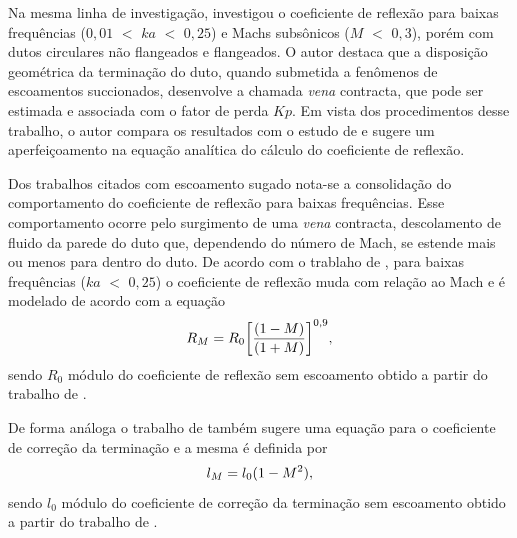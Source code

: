 Na mesma linha de investigação,  investigou o coeficiente de reflexão para baixas frequências ($0,01$ $<$ $ka$ $<$ $0,25$) e Machs subsônicos ($M$ $<$ $0,3$), porém com dutos circulares não flangeados e flangeados. O autor destaca que a disposição geométrica da terminação do duto, quando submetida a fenômenos de escoamentos succionados, desenvolve a chamada \textit{vena} contracta, que pode ser estimada e associada com o fator de perda $Kp$. Em vista dos procedimentos desse trabalho, o autor compara os resultados com o estudo de  e sugere um aperfeiçoamento na equação analítica do cálculo do coeficiente de reflexão.

Dos trabalhos citados com escoamento sugado nota-se a consolidação do comportamento do coeficiente de reflexão para baixas frequências. Esse comportamento ocorre pelo surgimento de uma \textit{vena} contracta, descolamento de fluido da parede do duto que, dependendo do número de Mach, se estende mais ou menos para dentro do duto. De acordo com o trablaho de , para baixas frequências ($ka$ $<$ $0,25$) o coeficiente de reflexão muda com relação ao Mach e é modelado de acordo com a equação
    \begin{equation}
        R_{M}\simbolo{$R_{M}$}{Coeficiente de reflexão em relação ao Mach} = R_{0}\bigg[\frac{(1 - M)}{(1 + M)}\bigg]^{0,9},
        \label{eq:R_M}
    \end{equation}
    sendo $R_{0}$ módulo do coeficiente de reflexão sem escoamento obtido a partir do trabalho de . 



    De forma análoga o trabalho de  também sugere uma equação para o coeficiente de correção da terminação e a mesma é definida por
    \begin{equation}
        l_{M}\simbolo{$l_{M}$}{Coeficiente de correção da terminação em relação ao Mach} = l_{0}(1 - M^{2}),
        \label{eq:l_M}
    \end{equation} 
    sendo $l_{0}$ módulo do coeficiente de correção da terminação sem escoamento obtido a partir do trabalho de .


